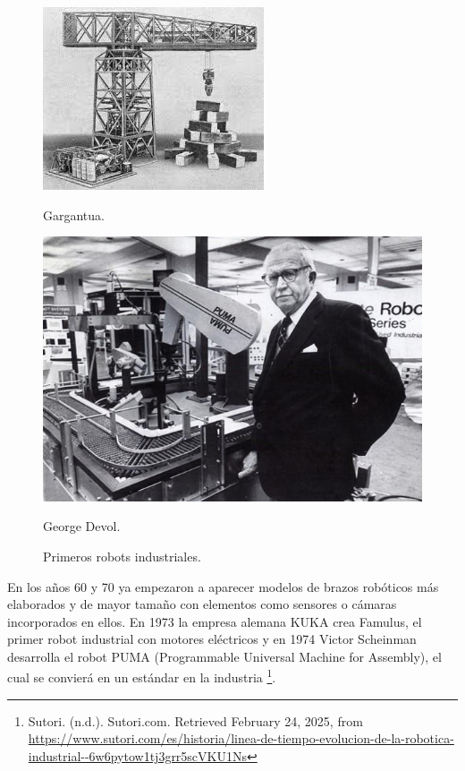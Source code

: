 \begin{figure}[ht!]
	\centering
	\begin{minipage}{0.44\linewidth}
		\centering
		\includegraphics[width=\linewidth]{figs/gargantua.jpg}
		\caption*{\centering Gargantua.}
	\end{minipage}
	\begin{minipage}{0.52\linewidth}
		\centering
		\includegraphics[width=\linewidth]{figs/George_Devol}
		\caption*{\centering George Devol.} 
	\end{minipage}
	\caption{Primeros robots industriales.}
	\label{fig:ancientrel}
\end{figure}

En los años 60 y 70 ya empezaron a aparecer modelos de brazos robóticos más elaborados y de mayor tamaño con elementos como sensores o cámaras incorporados en ellos. En 1973 la empresa alemana KUKA crea Famulus, el primer robot industrial con motores eléctricos y en 1974 Victor Scheinman desarrolla el robot PUMA (Programmable Universal Machine for Assembly), el cual se convierá en un estándar en la industria \footnote{Sutori. (n.d.). Sutori.com. Retrieved February 24, 2025, from \url{ https://www.sutori.com/es/historia/linea-de-tiempo-evolucion-de-la-robotica-industrial--6w6pytow1tj3grr5scVKU1Ns}}. \\

